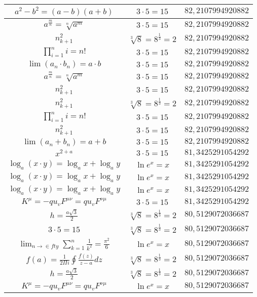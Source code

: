 \documentclass{article}
\begin{document}
\begin{flushleft}
\begin{longtable}{|c|c|c|}
$a^2-b^2=(a-b)(a+b)$ & $3\cdot 5=15$ & $82,2107994920882$ \\ \hline 
$a^{\frac{m}{n}}=\sqrt[n]{a^{m}}$ & $3\cdot 5=15$ & $82,2107994920882$ \\ \hline 
$n_{k+1}^2$ & $\sqrt[3]{8}=8^{\frac{1}{3}}=2$ & $82,2107994920882$ \\ \hline 
$\prod_{i=1}^ni=n!$ & $3\cdot 5=15$ & $82,2107994920882$ \\ \hline 
$\lim\left(a_n\cdot b_n\right)=a\cdot b$ & $3\cdot 5=15$ & $82,2107994920882$ \\ \hline 
$a^{\frac{m}{n}}=\sqrt[n]{a^{m}}$ & $3\cdot 5=15$ & $82,2107994920882$ \\ \hline 
$n_{k+1}^2$ & $3\cdot 5=15$ & $82,2107994920882$ \\ \hline 
$n_{k+1}^2$ & $\sqrt[3]{8}=8^{\frac{1}{3}}=2$ & $82,2107994920882$ \\ \hline 
$\prod_{i=1}^ni=n!$ & $3\cdot 5=15$ & $82,2107994920882$ \\ \hline 
$n_{k+1}^2$ & $3\cdot 5=15$ & $82,2107994920882$ \\ \hline 
$\lim\left(a_n+b_n\right)=a+b$ & $3\cdot 5=15$ & $82,2107994920882$ \\ \hline 
$x^{2+a}$ & $3\cdot 5=15$ & $81,3425291054292$ \\ \hline 
$\log_{a}(x\cdot y)=\log_{a}x+\log_{a}y$ & $\ln e^x=x$ & $81,3425291054292$ \\ \hline 
$\log_{a}(x\cdot y)=\log_{a}x+\log_{a}y$ & $\ln e^x=x$ & $81,3425291054292$ \\ \hline 
$\log_{a}(x\cdot y)=\log_{a}x+\log_{a}y$ & $\ln e^x=x$ & $81,3425291054292$ \\ \hline 
$K^\mu=-qu_vF^{\mu\nu}=qu_vF^{\nu\mu}$ & $3\cdot 5=15$ & $81,3425291054292$ \\ \hline 
$h=\frac{a\sqrt{3}}{2}$ & $\sqrt[3]{8}=8^{\frac{1}{3}}=2$ & $80,5129072036687$ \\ \hline 
$3\cdot 5=15$ & $\sqrt[3]{8}=8^{\frac{1}{3}}=2$ & $80,5129072036687$ \\ \hline 
$\lim_{n\to\in fty}\sum_{k=1}^n\frac{1}{k^2}=\frac{\pi^2}{6}$ & $\ln e^x=x$ & $80,5129072036687$ \\ \hline 
$f\left(a\right)=\frac{1}{2\Pi i}\oint\frac{f\left(z\right)}{z-a}dz$ & $\sqrt[3]{8}=8^{\frac{1}{3}}=2$ & $80,5129072036687$ \\ \hline 
$h=\frac{a\sqrt{3}}{2}$ & $\sqrt[3]{8}=8^{\frac{1}{3}}=2$ & $80,5129072036687$ \\ \hline 
$K^\mu=-qu_vF^{\mu\nu}=qu_vF^{\nu\mu}$ & $\ln e^x=x$ & $80,5129072036687$ \\ \hline 

\end{longtable}
\end{flushleft}
\end{document}
